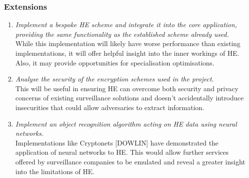 \subsubsection{Extensions}
\begin{enumerate}[leftmargin=1.75cm,label=\texttt{B\arabic*:}]
    \item \textit{Implement a bespoke HE scheme and integrate it into the core application, providing the same functionality as the established scheme already used.} \smallskip \\ While this implementation will likely have worse performance than existing implementations, it will offer helpful insight into the inner workings of HE. Also, it may provide opportunities for specialisation optimisations.
    \item \textit{Analyse the security of the encryption schemes used in the project.} \smallskip \\ This will be useful in ensuring HE can overcome both security and privacy concerns of existing surveillance solutions and doesn't accidentally introduce insecurities that could allow adversaries to extract information.
    \item \textit{Implement an object recognition algorithm acting on HE data using neural networks.} \smallskip \\ Implementations like Cryptonets [DOWLIN] have demonstrated the application of neural networks to HE. This would allow further services offered by surveillance companies to be emulated and reveal a greater insight into the limitations of HE.   
\end{enumerate}

\setlength{\leftskip}{0cm}

